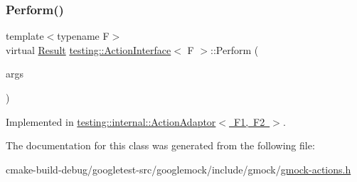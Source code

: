 \subsubsection{\texorpdfstring{Perform()}{Perform()}}
{\footnotesize\ttfamily template$<$typename F$>$ \\
virtual \mbox{\hyperlink{classtesting_1_1ActionInterface_a7477de2fe3e4e01c59db698203acaee7}{Result}} \mbox{\hyperlink{classtesting_1_1ActionInterface}{testing\+::\+Action\+Interface}}$<$ F $>$\+::Perform (\begin{DoxyParamCaption}\item[{const \mbox{\hyperlink{classtesting_1_1ActionInterface_af72720d864da4d606629e83edc003511}{Argument\+Tuple}} \&}]{args }\end{DoxyParamCaption})\hspace{0.3cm}{\ttfamily [pure virtual]}}



Implemented in \mbox{\hyperlink{classtesting_1_1internal_1_1ActionAdaptor_a8d8a47a31f068cf6e0c95b91605d5540}{testing\+::internal\+::\+Action\+Adaptor$<$ F1, F2 $>$}}.



The documentation for this class was generated from the following file\+:\begin{DoxyCompactItemize}
\item 
cmake-\/build-\/debug/googletest-\/src/googlemock/include/gmock/\mbox{\hyperlink{gmock-actions_8h}{gmock-\/actions.\+h}}\end{DoxyCompactItemize}
